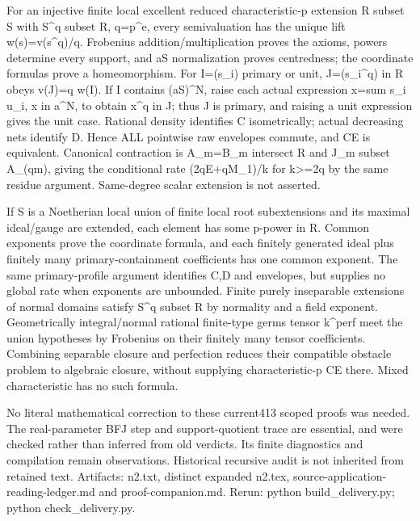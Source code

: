 For an injective finite local excellent reduced characteristic-p extension R subset S with S\textasciicircum{}q subset R, q=p\textasciicircum{}e, every semivaluation has the unique lift w(s)=v(s\textasciicircum{}q)/q. Frobenius addition/multiplication proves the axioms, powers determine every support, and aS normalization proves centredness; the coordinate formulas prove a homeomorphism. For I=(s\_i) primary or unit, J=(s\_i\textasciicircum{}q) in R obeys v(J)=q w(I). If I contains (aS)\textasciicircum{}N, raise each actual expression x=sum s\_i u\_i, x in a\textasciicircum{}N, to obtain x\textasciicircum{}q in J; thus J is primary, and raising a unit expression gives the unit case. Rational density identifies C isometrically; actual decreasing nets identify D. Hence ALL pointwise raw envelopes commute, and CE is equivalent. Canonical contraction is A\_m=B\_m intersect R and J\_m subset A\_(qm), giving the conditional rate (2qE+qM\_1)/k for k>=2q by the same residue argument. Same-degree scalar extension is not asserted.

If S is a Noetherian local union of finite local root subextensions and its maximal ideal/gauge are extended, each element has some p-power in R. Common exponents prove the coordinate formula, and each finitely generated ideal plus finitely many primary-containment coefficients has one common exponent. The same primary-profile argument identifies C,D and envelopes, but supplies no global rate when exponents are unbounded. Finite purely inseparable extensions of normal domains satisfy S\textasciicircum{}q subset R by normality and a field exponent. Geometrically integral/normal rational finite-type germs tensor k\textasciicircum{}perf meet the union hypotheses by Frobenius on their finitely many tensor coefficients. Combining separable closure and perfection reduces their compatible obstacle problem to algebraic closure, without supplying characteristic-p CE there. Mixed characteristic has no such formula.

No literal mathematical correction to these current413 scoped proofs was needed. The real-parameter BFJ step and support-quotient trace are essential, and were checked rather than inferred from old verdicts. Its finite diagnostics and compilation remain observations. Historical recursive audit is not inherited from retained text. Artifacts: n2.txt, distinct expanded n2.tex, source-application-reading-ledger.md and proof-companion.md. Rerun: python build\_delivery.py; python check\_delivery.py.

